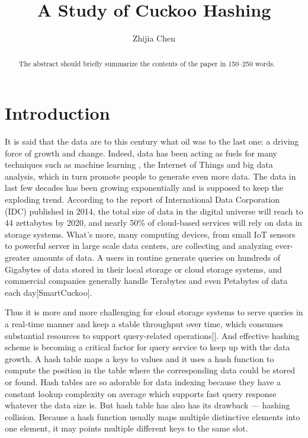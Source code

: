 \documentclass[runningheads]{llncs}
\begin{document}
%
\title{A Study of Cuckoo Hashing}
%
%
\author{Zhijia Chen}

\maketitle              %
%
\begin{abstract}
The abstract should briefly summarize the contents of the paper in
150--250 words.

\end{abstract}
%
%
%
\section{Introduction}
It is said that the data are to this century what oil was to the last one: a driving force of growth and change. Indeed, data has been acting as fuels for many techniques such as machine learning , the Internet of Things and big data analysis, which in turn promote people to generate even more data. The data in last few decades has been growing exponentially and is supposed to keep the exploding trend. According to the report of International Data Corporation (IDC) published in 2014, the total size of data in the digital universe will reach to 44 zettabytes by 2020, and nearly 50\% of cloud-based services will rely on data in storage systems. What's more, many computing devices, from small IoT sensors to powerful server in large scale data centers, are collecting and analyzing ever-greater amounts of data. A users in routine generate queries on hundreds of Gigabytes of data stored in their local storage or cloud storage systems, and commercial companies generally handle Terabytes and even Petabytes of data each day[SmartCuckoo].

Thus it is more and more challenging for cloud storage systems to serve queries in a real-time manner and keep a stable throughput over time, which consumes substantial resources to support query-related operations[]. And effective hashing scheme is becoming a critical factor for query service to keep up with the data growth. A hash table maps a keys to values and it uses a hash function to compute the position in the table where the corresponding data could be stored or found. Hash tables are so adorable for data indexing because they have a constant lookup complexity on average which supports fast query response whatever the data size is. But hash table has also has its drawback --- hashing collision. Because a hash function usually maps multiple distinctive elements into one element, it may points multiple different keys to the same slot.
\end{document}
